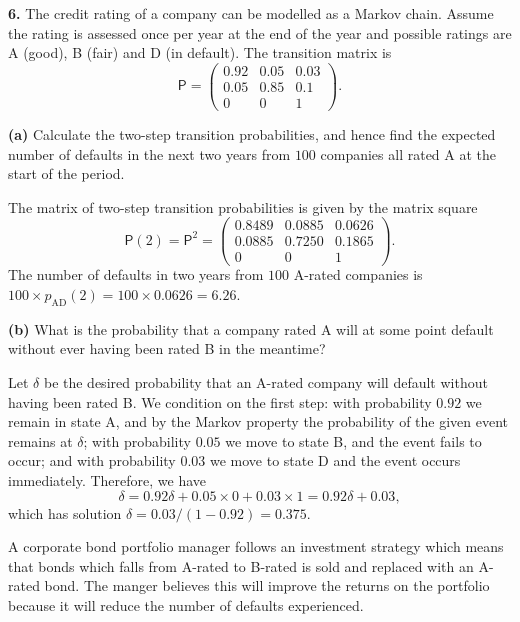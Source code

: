 \documentclass[
  a4paper,
]{article}
\theoremstyle{definition}
\theoremstyle{definition}
\theoremstyle{definition}
\theoremstyle{remark}
\begin{document}
\textbf{6.} The credit rating of a company can be modelled as a Markov chain. Assume the rating is assessed once per year at the end of the year and possible ratings are A (good), B (fair) and D (in default). The transition matrix is
\[\mathsf P=\begin{pmatrix} 0.92&0.05&0.03\\
0.05&0.85&0.1\\
0&0&1 \end{pmatrix} . \]

\textbf{(a)} Calculate the two-step transition probabilities, and hence find the expected number of defaults in the next two years from \(100\) companies all rated A at the start of the period.

\begin{myanswers}

The matrix of two-step transition probabilities is given by the matrix square
\[\mathsf P(2) = \mathsf P^2= \begin{pmatrix} 0.8489&0.0885&0.0626\\
0.0885&0.7250&0.1865\\
0&0&1 \end{pmatrix}. \]
The number of defaults in two years from \(100\) A-rated companies is \(100 \times p_{\mathrm{AD}}(2) = 100 \times 0.0626 = 6.26\).

\end{myanswers}

\textbf{(b)} What is the probability that a company rated A will at some point default without ever having been rated B in the meantime?

\begin{myanswers}

Let \(\delta\) be the desired probability that an A-rated company will default without having been rated B. We condition on the first step: with probability \(0.92\) we remain in state A, and by the Markov property the probability of the given event remains at \(\delta\); with probability \(0.05\) we move to state B, and the event fails to occur; and with probability \(0.03\) we move to state D and the event occurs immediately. Therefore, we have
\[ \delta = 0.92\delta + 0.05\times 0 + 0.03 \times 1 = 0.92\delta + 0.03 ,  \]
which has solution \(\delta = 0.03/(1-0.92) = 0.375\).

\end{myanswers}

A corporate bond portfolio manager follows an investment strategy which means that bonds which falls from A-rated to B-rated is sold and replaced with an A-rated bond. The manger believes this will improve the returns on the portfolio because it will reduce the number of defaults experienced.
\end{document}
